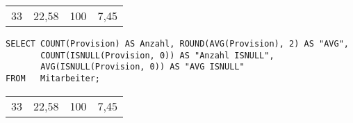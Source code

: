         \begin{center}
          \begin{small}
            \tablehead{}

            \begin{oraclesql}
              \begin{supertabular}{rrrr}
                33 & 22,58 & 100 & 7,45 \\
              \end{supertabular}
            \end{oraclesql}
          \end{small}
        \end{center}
        \begin{lstlisting}[language=ms_sql,caption={AVG und NULL-Werte im MS SQL Server},label=sql05_10]
SELECT COUNT(Provision) AS Anzahl, ROUND(AVG(Provision), 2) AS "AVG",
       COUNT(ISNULL(Provision, 0)) AS "Anzahl ISNULL",
       AVG(ISNULL(Provision, 0)) AS "AVG ISNULL"
FROM   Mitarbeiter;
        \end{lstlisting}
        \begin{center}
          \begin{small}
            \tablehead{}

            \begin{mssql}
              \begin{supertabular}{llll}
                33 & 22,58 & 100 & 7,45 \\
              \end{supertabular}
            \end{mssql}
          \end{small}
        \end{center}
